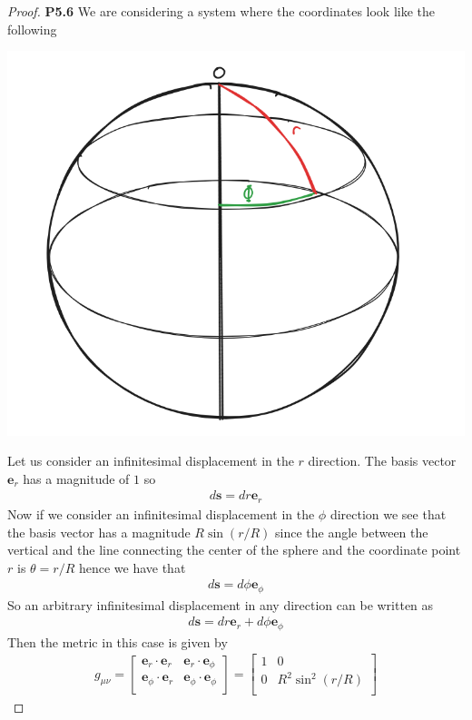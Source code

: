 \documentclass[11pt]{article}
\theoremstyle{definition}
\begin{document}
\cleardoublepage
\begin{proof}{\textbf{P5.6}}
    We are considering a system where the coordinates look like the following 
    \begin{center}
        \includegraphics*[scale=0.4]{ch5_p5.6.png}
    \end{center}
    Let us consider an infinitesimal displacement in the $r$ direction.
    The basis vector $\bm{e}_r$ has a magnitude of $1$ so
    \begin{align*}
        d\bm{s} = dr\bm{e}_r
    \end{align*}
    Now if we consider an infinitesimal displacement in the $\phi$ direction
    we see that the basis vector has a magnitude $R\sin(r/R)$ since the angle
    between the vertical and the line connecting the center of the sphere and
    the coordinate point $r$ is $\theta = r/R$ hence we have that
    \begin{align*}
        d\bm{s} = d\phi\bm{e}_\phi
    \end{align*}
    So an arbitrary infinitesimal displacement in any direction can
    be written as
    \begin{align*}
        d\bm{s} = dr\bm{e}_r + d\phi\bm{e}_\phi
    \end{align*}
    Then the metric in this case is given by
    \begin{align*}
        g_{\mu\nu} = \begin{bmatrix}
            \bm{e}_r\cdot\bm{e}_r & \bm{e}_r\cdot\bm{e}_\phi\\
            \bm{e}_\phi\cdot\bm{e}_r & \bm{e}_\phi\cdot\bm{e}_\phi\\
        \end{bmatrix}
        = \begin{bmatrix}
            1 & 0\\
            0 & R^2\sin^2 (r/R)\\
        \end{bmatrix}
    \end{align*}
\end{proof}
\end{document}
